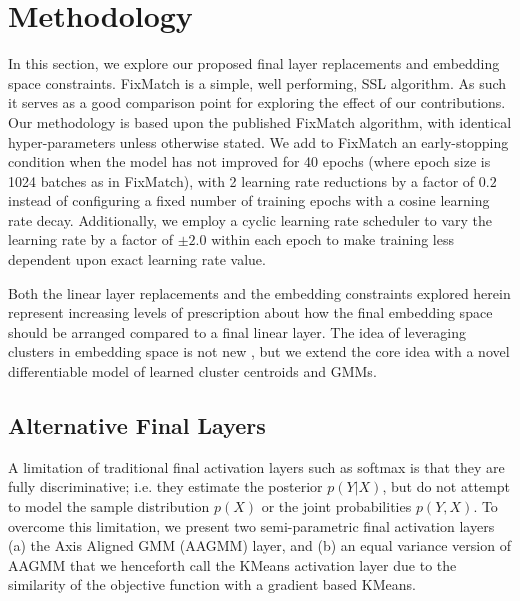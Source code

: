 \documentclass[10pt,twocolumn,letterpaper]{article}
\begin{document}



\section{Methodology}

In this section, we explore our proposed final layer replacements and embedding space constraints.
FixMatch \cite{sohn2020fixmatch} is a simple, well performing, SSL algorithm.
As such it serves as a good comparison point for exploring the effect of our contributions.
Our methodology is based upon the published FixMatch \cite{sohn2020fixmatch} algorithm, with identical hyper-parameters unless otherwise stated.
We add to FixMatch an early-stopping condition when the model has not improved for 40 epochs (where epoch size is 1024 batches as in FixMatch), with 2 learning rate reductions by a factor of $0.2$ instead of configuring a fixed number of training epochs with a cosine learning rate decay.
Additionally, we employ a cyclic learning rate scheduler to vary the learning rate by a factor of $\pm2.0$ within each epoch to make training less dependent upon exact learning rate value.

Both the linear layer replacements and the embedding constraints explored herein represent increasing levels of prescription about how the final embedding space should be arranged compared to a final linear layer.
The idea of leveraging clusters in embedding space is not new \cite{caron2018deep,caron2020unsupervised,enguehard2019semi}, but we extend the core idea with a novel differentiable model of learned cluster centroids and GMMs.

\subsection{Alternative Final Layers}

A limitation of traditional final activation layers such as softmax is that they are fully discriminative; i.e. they estimate the posterior $p(Y|X)$, but do not attempt to model the sample distribution $p(X)$ or the joint probabilities $p(Y,X)$. 
To overcome this limitation, we present two semi-parametric final activation layers (a) the Axis Aligned GMM (AAGMM) layer, and (b) an equal variance version of AAGMM that we henceforth call the KMeans activation layer due to the similarity of the objective function with a gradient based KMeans.
\end{document}
